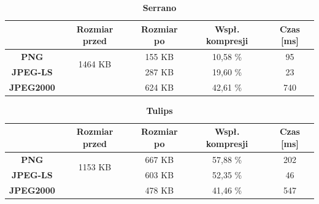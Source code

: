 \begin{table}[!h]
	\centering
	\caption{\textbf{Serrano}}
	\label{my-label}
	\begin{tabular}{|c|c|c|c|c|}                                             
		\hline
		& \textbf{Rozmiar przed} & \textbf{Rozmiar po} & \textbf{Wspł. kompresji} & \textbf{Czas {[}ms{]}} \\ \hline 
		\textbf{PNG}      &          \multicolumn{1}{c|}{\multirow{2}{*}{1464 KB}}             &       155 KB              &            10,58 \%              &           95                  \\\cline{3-5}
		\textbf{JPEG-LS}  &                        &         287 KB            &      19,60 \%                   &          23                \\\cline{3-5}
		\textbf{JPEG2000} &                        &         624 KB            &         42,61 \%                 &       740               \\ \hline
	\end{tabular}
\end{table}

\begin{table}[!h]
	\centering
	\caption{\textbf{Tulips}}
	\label{my-label}
	\begin{tabular}{|c|c|c|c|c|}                                             
		\hline
		& \textbf{Rozmiar przed} & \textbf{Rozmiar po} & \textbf{Wspł. kompresji} & \textbf{Czas {[}ms{]}} \\ \hline 
		\textbf{PNG}      &          \multicolumn{1}{c|}{\multirow{2}{*}{1153 KB}}             &        667 KB             &      57,88 \%                   &          202                   \\\cline{3-5}
		\textbf{JPEG-LS}  &                        &      603  KB             &       52,35 \%                  &          46                \\\cline{3-5}
		\textbf{JPEG2000} &                        &      478 KB               &       41,46 \%                  &     547                 \\ \hline
	\end{tabular}
\end{table}




